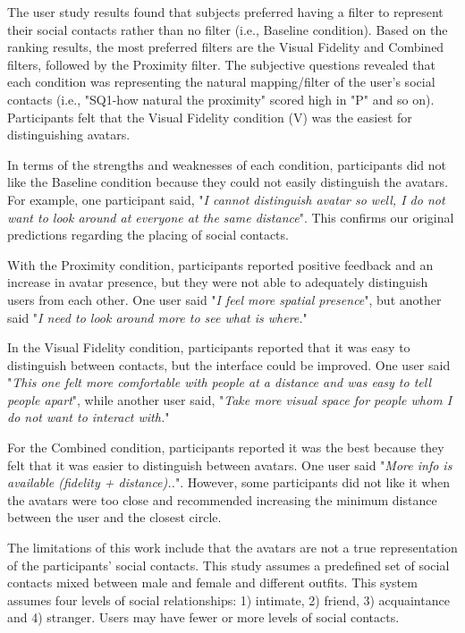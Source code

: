 The user study results found that subjects preferred having a filter to represent their social contacts rather than no filter (i.e., Baseline condition). Based on the ranking results, the most preferred filters are the Visual Fidelity and Combined filters, followed by the Proximity filter.
The subjective questions revealed that each condition was representing the natural mapping/filter of the user's social contacts (i.e., "SQ1-how natural the proximity" scored high in "P" and so on). Participants felt that the Visual Fidelity condition (V) was the easiest for distinguishing avatars.

In terms of the strengths and weaknesses of each condition, participants did not like the Baseline condition because they could not easily distinguish the avatars. For example, one participant said, "\textit{I cannot distinguish avatar so well, I do not want to look around at everyone at the same distance}". This confirms our original predictions regarding the placing of social contacts.

With the Proximity condition, participants reported positive feedback and an increase in avatar presence, but they were not able to adequately distinguish users from each other.  One user said "\textit{I feel more spatial presence}", but another said "\textit{I need to look around more to see what is where.}"

In the Visual Fidelity condition, participants reported that it was easy to distinguish between contacts, but the interface could be improved. One user said "\textit{This one felt more comfortable with people at a distance and was easy to tell people apart}", while another user said, "\textit{Take more visual space for people whom I do not want to interact with.}"

For the Combined condition, participants reported it was the best because they felt that it was easier to distinguish between avatars. One user said "\textit{More info is available (fidelity + distance)..}".
However, some participants did not like it when the avatars were too close and recommended increasing the minimum distance between the user and the closest circle.

The limitations of this work include that the avatars are not a true representation of the participants' social contacts. This study assumes a predefined set of social contacts mixed between male and female and different outfits. This system assumes four levels of social relationships: 1) intimate, 2) friend, 3) acquaintance and 4) stranger. Users may have fewer or more levels of social contacts. 

